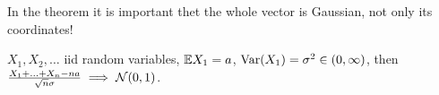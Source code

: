 	\begin{remark}
		In the theorem it is important thet the whole vector is Gaussian, not only its coordinates!
	\end{remark}
	
	\begin{theorem}
		$X_1, X_2, \ldots$ iid random variables, $\mathbb{E} X_1 = a$, $\mathrm{Var}(X_1) = \sigma^2 \in (0,\infty)$, then $\frac{X_1 + \ldots + X_n - na}{\sqrt{n}\sigma} \implies \mathcal{N}(0,1)$.
	\end{theorem}


















 
 
